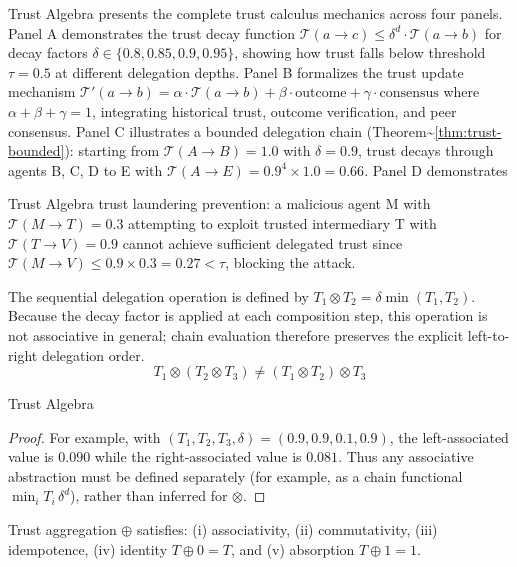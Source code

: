 \documentclass[
  ignorenonframetext,
]{beamer}
\providecommand{\Cref}[1]{\texttt{\detokenize{#1}}}
\begin{document}
\begin{frame}[allowframebreaks]{Trust Algebra}
\Cref{fig:trust-calculus-comprehensive} presents the complete trust
calculus mechanics across four panels. Panel A demonstrates the trust
decay function
\(\mathcal{T}(a \to c) \leq \delta^d \cdot \mathcal{T}(a \to b)\) for
decay factors \(\delta \in \{0.8, 0.85, 0.9, 0.95\}\), showing how trust
falls below threshold \(\tau = 0.5\) at different delegation depths.
Panel B formalizes the trust update mechanism
\(\mathcal{T}'(a \to b) = \alpha \cdot \mathcal{T}(a \to b) + \beta \cdot \text{outcome} + \gamma \cdot \text{consensus}\)
where \(\alpha + \beta + \gamma = 1\), integrating historical trust,
outcome verification, and peer consensus. Panel C illustrates a bounded
delegation chain (Theorem\textasciitilde{}\ref{thm:trust-bounded}):
starting from \(\mathcal{T}(A \to B) = 1.0\) with \(\delta = 0.9\),
trust decays through agents B, C, D to E with
\(\mathcal{T}(A \to E) = 0.9^4 \times 1.0 = 0.66\). Panel D demonstrates
\end{frame}

\begin{frame}[allowframebreaks]{Trust Algebra}
trust laundering prevention: a malicious agent M with
\(\mathcal{T}(M \to T) = 0.3\) attempting to exploit trusted
intermediary T with \(\mathcal{T}(T \to V) = 0.9\) cannot achieve
sufficient delegated trust since
\(\mathcal{T}(M \to V) \leq 0.9 \times 0.3 = 0.27 < \tau\), blocking the
attack.

\begin{theorem}
\label{thm:delegation-assoc}
The sequential delegation operation is defined by
\(T_1 \otimes T_2 = \delta\min(T_1,T_2)\). Because the decay factor is
applied at each composition step, this operation is not associative in
general; chain evaluation therefore preserves the explicit left-to-right
delegation order.
\begin{equation}
\label{eq:delegation-assoc}
T_1 \otimes (T_2 \otimes T_3) \neq (T_1 \otimes T_2) \otimes T_3
\end{equation}
\end{theorem}

\end{frame}

\begin{frame}[allowframebreaks]{Trust Algebra}
\begin{proof}
For example, with $(T_1,T_2,T_3,\delta)=(0.9,0.9,0.1,0.9)$, the left-associated
value is $0.090$ while the right-associated value is $0.081$. Thus any
associative abstraction must be defined separately (for example, as a chain
functional $\min_i T_i\,\delta^d$), rather than inferred for $\otimes$.
\end{proof}

\begin{theorem}
\label{thm:aggregation}
Trust aggregation $\oplus$ satisfies: (i) associativity, (ii) commutativity, (iii) idempotence, (iv) identity $T \oplus 0 = T$, and (v) absorption $T \oplus 1 = 1$.
\end{theorem}

\end{frame}
\end{document}
